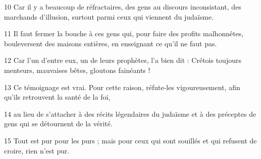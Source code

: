 
10 Car il y a beaucoup de réfractaires, des gens au discours inconsistant, des marchands d’illusion, surtout parmi ceux qui viennent du judaïsme.

11 Il faut fermer la bouche à ces gens qui, pour faire des profits malhonnêtes, bouleversent des maisons entières, en enseignant ce qu’il ne faut pas.

12 Car l’un d’entre eux, un de leurs prophètes, l’a bien dit : Crétois toujours menteurs, mauvaises bêtes, gloutons fainéants !

13 Ce témoignage est vrai. Pour cette raison, réfute-les vigoureusement, afin qu’ils retrouvent la santé de la foi,

14 au lieu de s’attacher à des récits légendaires du judaïsme et à des préceptes de gens qui se détournent de la vérité.

15 Tout est pur pour les purs ; mais pour ceux qui sont souillés et qui refusent de croire, rien n’est pur.